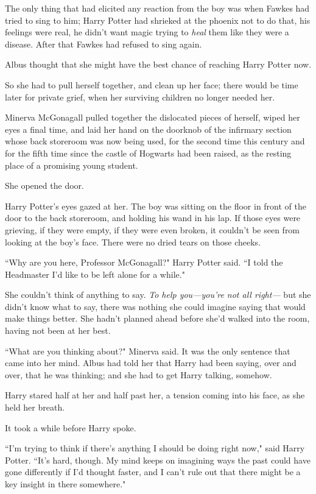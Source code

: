The only thing that had elicited any reaction from the boy was when Fawkes had tried to sing to him; Harry Potter had shrieked at the phoenix not to do that, his feelings were real, he didn't want magic trying to \emph{heal} them like they were a disease. After that Fawkes had refused to sing again.

Albus thought that she might have the best chance of reaching Harry Potter now.

So she had to pull herself together, and clean up her face; there would be time later for private grief, when her surviving children no longer needed her.

Minerva McGonagall pulled together the dislocated pieces of herself, wiped her eyes a final time, and laid her hand on the doorknob of the infirmary section whose back storeroom was now being used, for the second time this century and for the fifth time since the castle of Hogwarts had been raised, as the resting place of a promising young student.

She opened the door.

Harry Potter's eyes gazed at her. The boy was sitting on the floor in front of the door to the back storeroom, and holding his wand in his lap. If those eyes were grieving, if they were empty, if they were even broken, it couldn't be seen from looking at the boy's face. There were no dried tears on those cheeks.

``Why are you here, Professor McGonagall?" Harry Potter said. ``I told the Headmaster I'd like to be left alone for a while."

She couldn't think of anything to say. \emph{To help you---you're not all right---} but she didn't know what to say, there was nothing she could imagine saying that would make things better. She hadn't planned ahead before she'd walked into the room, having not been at her best.

``What are you thinking about?" Minerva said. It was the only sentence that came into her mind. Albus had told her that Harry had been saying, over and over, that he was thinking; and she had to get Harry talking, somehow.

Harry stared half at her and half past her, a tension coming into his face, as she held her breath.

It took a while before Harry spoke.

``I'm trying to think if there's anything I should be doing right now," said Harry Potter. ``It's hard, though. My mind keeps on imagining ways the past could have gone differently if I'd thought faster, and I can't rule out that there might be a key insight in there somewhere."

